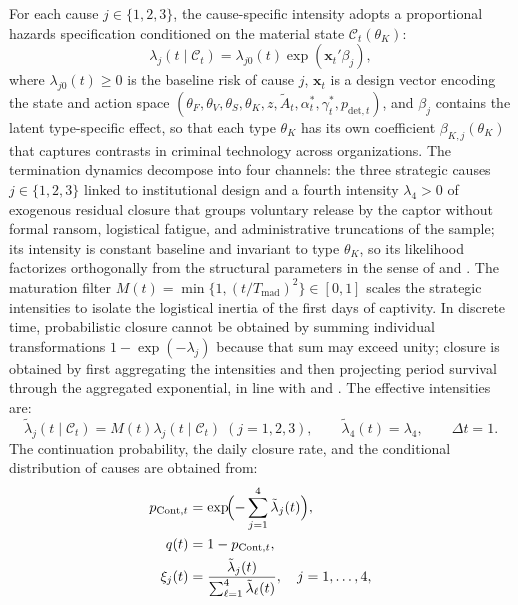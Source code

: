 \documentclass[pdflatex,sn-mathphys-ay]{sn-jnl}
\theoremstyle{plain}
\theoremstyle{definition}
\newcommand{\1}{\mathbf{1}}
\begin{document}
For each cause $j\in\{1,2,3\}$, the cause-specific intensity adopts a proportional hazards specification conditioned on the material state $\mathcal{C}_t(\theta_K)$:
\begin{equation}
\lambda_j(t\mid\mathcal{C}_t)=\lambda_{j0}(t)\exp(\mathbf{x}_t'\beta_j),
\label{eq:lambda-j}
\end{equation}
where $\lambda_{j0}(t)\ge 0$ is the baseline risk of cause $j$, $\mathbf{x}_t$ is a design vector encoding the state and action space $(\theta_F,\theta_V,\theta_S,\theta_K,z,\tilde{A}_t,\alpha_t^\ast,\gamma_t^\ast,p_{\mathrm{det},t})$, and $\beta_j$ contains the latent type-specific effect, so that each type $\theta_K$ has its own coefficient $\beta_{K,j}(\theta_K)$ that captures contrasts in criminal technology across organizations. The termination dynamics decompose into four channels: the three strategic causes $j\in\{1,2,3\}$ linked to institutional design and a fourth intensity $\lambda_4>0$ of exogenous residual closure that groups voluntary release by the captor without formal ransom, logistical fatigue, and administrative truncations of the sample; its intensity is constant baseline and invariant to type $\theta_K$, so its likelihood factorizes orthogonally from the structural parameters in the sense of \citet{Lancaster1990} and \citet{AbbringVanDenBerg2003}. The maturation filter $M(t)=\min\{1,(t/T_{\mathrm{mad}})^2\}\in[0,1]$ scales the strategic intensities to isolate the logistical inertia of the first days of captivity. In discrete time, probabilistic closure cannot be obtained by summing individual transformations $1-\exp(-\lambda_j)$ because that sum may exceed unity; closure is obtained by first aggregating the intensities and then projecting period survival through the aggregated exponential, in line with \citet{Sueyoshi1992} and \citet{Wooldridge2010}. The effective intensities are:
\begin{equation}
\tilde{\lambda}_j(t\mid\mathcal{C}_t)=M(t)\lambda_j(t\mid\mathcal{C}_t)\;(j=1,2,3),\qquad\tilde{\lambda}_4(t)=\lambda_4,\qquad\Delta t=1.
\label{eq:hj}
\end{equation}
The continuation probability, the daily closure rate, and the conditional distribution of causes are obtained from:
\begin{align}
p_{\mathrm{Cont},t} &= \exp\!\Bigl(-\sum_{j=1}^{4}\tilde{\lambda}_j(t)\Bigr),\label{eq:pCont}\\
q(t) &= 1-p_{\mathrm{Cont},t},\label{eq:q}\\
\xi_j(t) &= \frac{\tilde{\lambda}_j(t)}{\sum_{\ell=1}^{4}\tilde{\lambda}_\ell(t)},\quad j=1,\ldots,4,\label{eq:xi}
\end{align}
\end{document}
